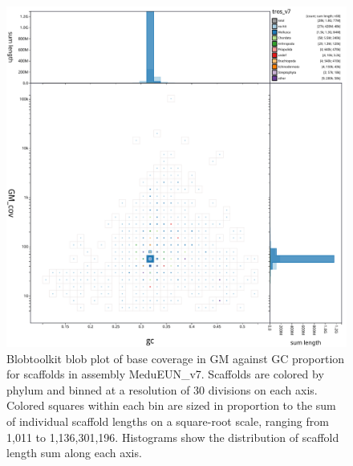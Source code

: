 \documentclass[11pt, a4paper]{article}
\begin{document}
\begin{figure}
	\includegraphics[width=\linewidth]{figures/btk_blob_MeduEUN_v7}
	\caption{Blobtoolkit blob plot of base coverage in GM against GC proportion for scaffolds in assembly MeduEUN\_v7. Scaffolds are colored by phylum and binned at a resolution of 30 divisions on each axis. Colored squares within each bin are sized in proportion to the sum of individual scaffold lengths on a square-root scale, ranging from 1,011 to 1,136,301,196. Histograms show the distribution of scaffold length sum along each axis.}
	\label{supfig:btk-blob-MeduEUN}
\end{figure}
\end{document}
